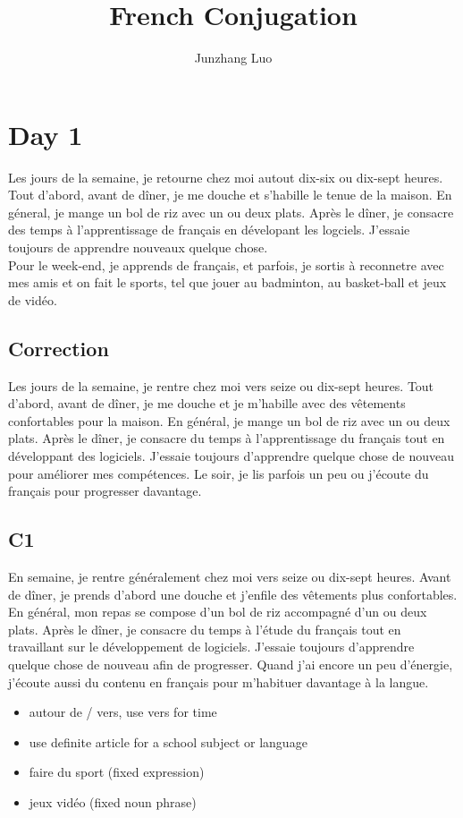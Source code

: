 \documentclass{book}
\title{French Conjugation}
\author{Junzhang Luo}
\begin{document}
\tableofcontents

\section{Day 1}
    Les jours de la semaine, je retourne chez moi autout dix-six ou dix-sept heures.
    Tout d'abord, avant de dîner, je me douche et s'habille le tenue de la maison.
    En géneral, je mange un bol de riz avec un ou deux plats. 
    Après le dîner, je consacre des temps à l'apprentissage de français en dévelopant les logciels.
    J'essaie toujours de apprendre nouveaux quelque chose.
    \\
    Pour le week-end, je apprends de français, et parfois, je sortis à reconnetre avec mes amis et on fait le sports, tel que jouer au badminton, au basket-ball et jeux de vidéo.

    \subsection{Correction}
        Les jours de la semaine, je rentre chez moi vers seize ou dix-sept heures.
        Tout d'abord, avant de dîner, je me douche et je m'habille avec des vêtements confortables pour la maison.
        En général, je mange un bol de riz avec un ou deux plats. 
        Après le dîner, je consacre du temps à l'apprentissage du français tout en développant des logiciels.
        J'essaie toujours d'apprendre quelque chose de nouveau pour améliorer mes compétences.
        Le soir, je lis parfois un peu ou j'écoute du français pour progresser davantage.

    \subsection{C1}
        En semaine, je rentre généralement chez moi vers seize ou dix-sept heures. 
        Avant de dîner, je prends d'abord une douche et j'enfile des vêtements plus confortables.
        En général, mon repas se compose d'un bol de riz accompagné d'un ou deux plats. 
        Après le dîner, je consacre du temps à l'étude du français tout en travaillant sur le développement de logiciels.
        J'essaie toujours d'apprendre quelque chose de nouveau afin de progresser.
        Quand j'ai encore un peu d'énergie, j'écoute aussi du contenu en français pour m'habituer davantage à la langue.

    \begin{itemize}
        \item autour de / vers, use vers for time
        \item use definite article for a school subject or language
        \item faire du sport (fixed expression)
        \item jeux vidéo (fixed noun phrase)
    \end{itemize}
\end{document}
